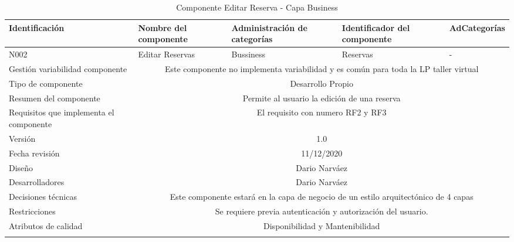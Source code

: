 \documentclass[10pt,a4paper,openany]{book}
\begin{document}
\begin{longtable}{|p{3cm}|p{3cm}|p{3cm}|p{3cm}|p{3cm}|} \hline
Identificación & Nombre del componente & Administración de categorías & Identificador del componente & AdCategorías \\[0.5ex] \hline
N002& Editar Reservas& Bussiness& Reservas& -\\[0.5ex] \hline
Gestión variabilidad componente & \multicolumn{4}{|c|}{Este componente no implementa variabilidad y es común para toda la LP taller virtual} \\ \hline
Tipo de componente & \multicolumn{4}{|c|}{Desarrollo Propio} \\ \hline
Resumen del componente & \multicolumn{4}{|c|}{Permite al usuario la edición de una reserva} \\ \hline
Requisitos que implementa el componente & \multicolumn{4}{|c|}{El requisito con numero RF2 y RF3 } \\ \hline
Versión & \multicolumn{4}{|c|}{1.0 } \\ \hline
Fecha revisión & \multicolumn{4}{|c|}{ 11/12/2020} \\ \hline
Diseño & \multicolumn{4}{|c|}{Dario Narváez} \\ \hline
Desarrolladores & \multicolumn{4}{|c|}{Dario Narváez} \\ \hline
Decisiones técnicas & \multicolumn{4}{|c|}{Este componente estará en la capa de negocio de un estilo arquitectónico de 4 capas  } \\ \hline
Restricciones & \multicolumn{4}{|c|}{Se requiere previa autenticación y autorización del usuario.} \\ \hline
Atributos de calidad & \multicolumn{4}{|c|}{Disponibilidad y Mantenibilidad} \\ \hline
\caption{Componente Editar Reserva - Capa Business}
\label{table:t6}
\end{longtable}
\end{document}
